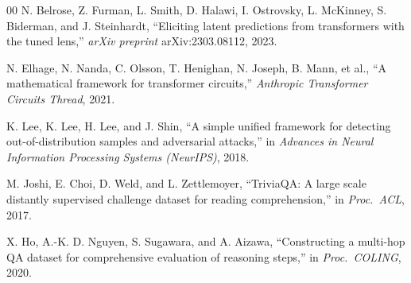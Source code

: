 \documentclass[conference]{IEEEtran}
\begin{document}
\begin{thebibliography}{00}
N. Belrose, Z. Furman, L. Smith, D. Halawi, I. Ostrovsky, L. McKinney, S. Biderman, and J. Steinhardt, ``Eliciting latent predictions from transformers with the tuned lens,'' \emph{arXiv preprint} arXiv:2303.08112, 2023.

N. Elhage, N. Nanda, C. Olsson, T. Henighan, N. Joseph, B. Mann, et al., ``A mathematical framework for transformer circuits,'' \emph{Anthropic Transformer Circuits Thread}, 2021.

K. Lee, K. Lee, H. Lee, and J. Shin, ``A simple unified framework for detecting out-of-distribution samples and adversarial attacks,'' in \emph{Advances in Neural Information Processing Systems (NeurIPS)}, 2018.

M. Joshi, E. Choi, D. Weld, and L. Zettlemoyer, ``TriviaQA: A large scale distantly supervised challenge dataset for reading comprehension,'' in \emph{Proc.\ ACL}, 2017.

X. Ho, A.-K. D. Nguyen, S. Sugawara, and A. Aizawa, ``Constructing a multi-hop QA dataset for comprehensive evaluation of reasoning steps,'' in \emph{Proc.\ COLING}, 2020.

\end{thebibliography}
\end{document}
